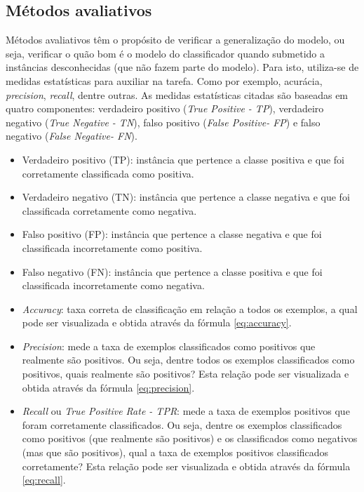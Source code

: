 \subsection{Métodos avaliativos}
\label{subsec:evaluationMethods}
Métodos avaliativos têm o propósito de verificar a generalização do modelo, ou seja, verificar o quão bom é o modelo do classificador quando submetido a instâncias desconhecidas (que não fazem parte do modelo). Para isto, utiliza-se de medidas estatísticas para auxiliar na tarefa\cite{Witten:2005}. Como por exemplo, acurácia, \textit{precision}, \textit{recall}, dentre outras. As medidas estatísticas citadas são baseadas em quatro componentes: verdadeiro positivo (\textit{True Positive - TP}), verdadeiro negativo (\textit{True Negative - TN}), falso positivo (\textit{False Positive- FP}) e falso negativo (\textit{False Negative- FN})\cite{Davis:2006}.

\begin{itemize}
\item Verdadeiro positivo (TP): instância que pertence a classe positiva e que foi corretamente classificada como positiva.
\item Verdadeiro negativo (TN): instância que pertence a classe negativa e que foi classificada corretamente como negativa.
\item Falso positivo (FP): instância que pertence a classe negativa e que foi classificada  incorretamente como positiva.
\item Falso negativo (FN): instância que pertence a classe positiva e que foi classificada incorretamente como negativa.
\end{itemize}

\begin{itemize}
\item \textit{Accuracy}: taxa correta de classificação em relação a todos os exemplos, a qual pode ser visualizada e obtida através da fórmula \ref{eq:accuracy}.\cite{Metz:1978}
\item \textit{Precision}: mede a taxa de exemplos classificados como positivos que realmente são positivos. Ou seja, dentre todos os exemplos classificados como positivos, quais realmente são positivos? Esta relação pode ser visualizada e obtida através da fórmula \ref{eq:precision}.\cite{Davis:2006}
\item \textit{Recall} ou \textit{True Positive Rate - TPR}: mede a taxa de exemplos positivos que foram corretamente classificados. Ou seja, dentre os exemplos classificados como positivos (que realmente são positivos) e os classificados como negativos (mas que são positivos), qual a taxa de exemplos positivos classificados corretamente?  Esta relação pode ser visualizada e obtida através da fórmula \ref{eq:recall}\cite{Davis:2006}.
\end{itemize}

